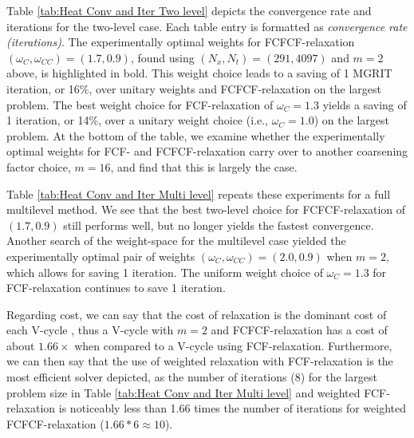 \documentclass[VANCOUVER,STIX1COL]{WileyNJD-v2}
\begin{document}
Table \ref{tab:Heat Conv and Iter Two level} depicts the convergence rate and iterations
for the two-level case.  Each table entry is formatted as \textit{convergence rate (iterations)}.
The experimentally optimal weights for FCFCF-relaxation $(\omega_{C}, \omega_{CC}) = (1.7, 0.9)$, found using 
$(N_x, N_t) = (291, 4097)$ and $m=2$ above, is highlighted in bold.  This weight choice leads to a saving 
of  1 MGRIT iteration, or 16\%, over unitary weights and FCFCF-relaxation on the largest problem.  
The best weight choice for FCF-relaxation of $\omega_C = 1.3$ yields a saving of 1 iteration, or 14\%, over a unitary weight choice (i.e., $\omega_C = 1.0$) on the largest problem.
At the bottom of the table, we examine whether the experimentally optimal weights for FCF- and FCFCF-relaxation carry over to another 
coarsening factor choice, $m = 16$, and find that this is largely the case.

Table \ref{tab:Heat Conv and Iter Multi level} repeats these experiments for a full multilevel method.
We see that the best two-level choice for FCFCF-relaxation of $(1.7, 0.9)$ still
performs well, but no longer yields the fastest convergence.  Another search of the weight-space for the 
multilevel case yielded
the experimentally optimal pair of weights $(\omega_{C}, \omega_{CC}) = (2.0, 0.9)$ when $m=2$, which allows for 
saving 1 iteration.  The uniform weight choice of $\omega_C = 1.3$ for FCF-relaxation 
continues to save 1 iteration.

Regarding cost, we can say that the cost of relaxation is the dominant cost of each V-cycle \cite{Fa2014}, thus a V-cycle with $m=2$ and 
FCFCF-relaxation has a cost of about $1.66\times$ when compared to a V-cycle using FCF-relaxation.  Furthermore, we can then say that the use of weighted relaxation with FCF-relaxation is the most efficient solver depicted, as the number of iterations (8) for the largest problem size in Table \ref{tab:Heat Conv and Iter Multi level} and weighted FCF-relaxation is noticeably less than 1.66 times the number of iterations for weighted FCFCF-relaxation ($1.66*6 \approx 10$).
 
\end{document}
